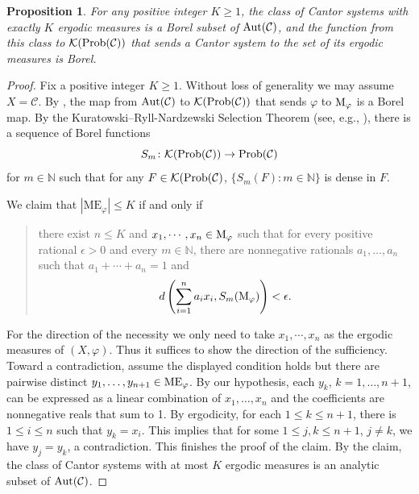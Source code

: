 \documentclass{amsart}
\newtheorem{proposition}[theorem]{Proposition}
\theoremstyle{definition}
\theoremstyle{problem}
\theoremstyle{remark}
\numberwithin{equation}{section}
\newcommand{\Aut}{\mbox{\rm Aut}}
\newcommand{\calK}{\mathcal{K}}
\begin{document}
\begin{proposition}
For any positive integer $K\ge1$, the class of Cantor systems with exactly $K$ ergodic measures is a Borel subset of $\Aut(\mathcal{C})$, and the function from this class to $\calK({\rm Prob}(\mathcal{C}))$ that sends a Cantor system to the set of its ergodic measures is Borel.
\end{proposition}

\begin{proof} Fix a positive integer $K\geq 1$. 
Without loss of generality we may assume $X=\mathcal{C}$.  By \cite[Lemma 4.2]{Melleray}, the map from $\rm{Aut(\mathcal{C})}$ to $\calK(\rm{Prob}(\mathcal{C}))$ that sends $\varphi$ to $ \mbox{\rm M}_\varphi$ is a Borel map.   By the Kuratowski--Ryll-Nardzewski Selection Theorem (see, e.g., \cite[Theorem 12.13]{KechrisBook}), there is a sequence of Borel functions 
$$S_m\colon \calK({\rm Prob}(\mathcal{C}))\to {\rm Prob}(\mathcal{C}) $$
for $m\in\mathbb{N}$ such that for any $F\in \calK(\mbox{\rm Prob}(\mathcal{C})$, $\{S_m(F)\colon m\in\mathbb{N}\}$ is dense in $F$. 

We claim that  $|\mbox{ME}_\varphi|\leq K $  if and only if 
\begin{quote}
there exist $n\leq K$ and $x_1,\cdots, x_n\in \mbox{\rm M}_\varphi$ such that for every positive rational $\epsilon>0$ and every $m\in\mathbb{N}$, there are nonnegative rationals $a_1,\dots, a_n$ such that $a_1+\cdots +a_n=1$ and 
$$d\left(\sum_{i=1}^na_ix_i, S_m(\mbox{\rm M}_\varphi)\right)<\epsilon.$$   
\end{quote}
For the direction of the necessity we only need to take $x_1,\cdots, x_n$ as the ergodic measures of $(X, \varphi)$.  Thus it suffices to show the direction of the sufficiency. Toward a contradiction, assume the displayed condition holds but there are pairwise distinct $y_1,\dots , y_{n+1} \in \rm{ME}_\varphi$. By our hypothesis, each $y_k$, $k=1,\dots, n+1$, can be expressed as a  linear  combination of $x_1, \dots, x_n$ and the coefficients are nonnegative reals that sum to 1. %
By ergodicity, for each $1\leq k\leq n+1$, there is $1\leq i\leq n$ such that $y_k=x_i$. This implies that for some $1\leq j, k\leq n+1$, $j\neq k$, we have $y_j=y_k$, a contradiction. This finishes the proof of the claim. By the claim, the class of Cantor systems with at most $K$ ergodic measures is an analytic subset of $\Aut(\mathcal{C})$.


\end{proof}
\end{document}
